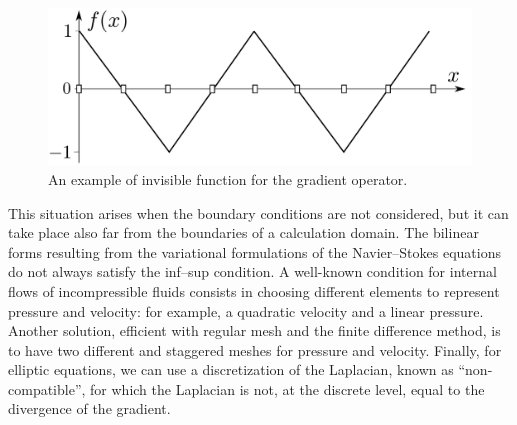 \begin{figure}[H]%
\centering
\includegraphics[scale=0.4]
{graphics/invisible_gradient.pdf}%
\caption{An example of invisible function for the gradient operator.}%
\label{parasite}%
\end{figure}


This situation arises when the boundary conditions are not considered, but it
can take place also far from the boundaries of a calculation domain. The
bilinear forms resulting from the variational formulations of the
Navier--Stokes equations do not always satisfy the inf--sup condition. A
well-known condition for internal flows of incompressible fluids consists in
choosing different elements to represent pressure and velocity: for example, a
quadratic velocity and a linear pressure.
Another solution, efficient with regular mesh and the finite difference method, is to
have two different and staggered meshes for pressure and velocity. Finally,
for elliptic equations, we can use a discretization of the Laplacian, known as
\textquotedblleft non-compatible\textquotedblright, for which the Laplacian is
not, at the discrete level, equal to the divergence of the gradient.

